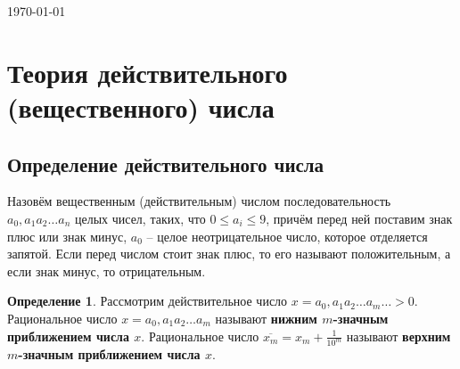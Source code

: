 \documentclass[a4paper,oneside]{article}
\theoremstyle{definition}
\newtheorem{definition}{Определение}[subsection]
\theoremstyle{definition}
\theoremstyle{definition}
\begin{document}
\begin{titlepage}
	
	
	\vfill\vfill\vfill %
	
	{\large\today} %
	
	
	 
	
	\vfill %
	
\end{titlepage}


\section{Теория действительного (вещественного) числа}

\subsection{Определение действительного числа}

Назовём вещественным (действительным) числом последовательность
$a_0,a_1 a_2 \dots a_n$ целых чисел, таких, что $0 \le a_i \le 9$,
причём перед ней поставим знак плюс или знак минус,
$a_0$ -- целое неотрицательное число, которое отделяется запятой.
Если перед числом стоит знак плюс, то его называют положительным,
а если знак минус, то отрицательным.

\begin{definition}
    Рассмотрим действительное число $x = a_0,a_1 a_2 \dots a_m \dots > 0$.
    Рациональное число $x = a_0,a_1 a_2 \dots a_m$ называют
    \textbf{нижним $m$-значным приближением числа $x$}.
    Рациональное число $\overline{x_m} = x_m + \frac{1}{10^m}$ называют
    \textbf{верхним $m$-значным приближением числа $x$}.
\end{definition}
\end{document}
